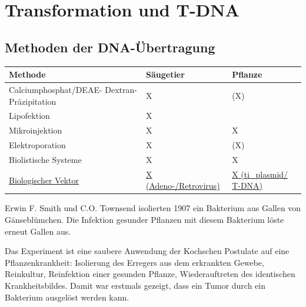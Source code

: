 \section{Transformation und T-DNA}\label{sec:transformation-und-t-dna}

\subsection{Methoden der DNA-Übertragung}\label{subsec:methoden-der-dna-ubertragung}
\begin{mytable}
    \begin{tabular}{|p{10cm}|l|l|}
        \hline
        \textbf{Methode}                & \textbf{Säugetier}                & \textbf{Pflanze}                  \\ \hline
        Calciumphosphat/DEAE-
        Dextran-Präzipitation           & X                                 & (X)                               \\
        Lipofektion                     & X                                 &                                   \\
        Mikroinjektion                  & X                                 & X                                 \\
        Elektroporation                 & X                                 & (X)                               \\
        Biolistische Systeme            & X                                 & X                                 \\
        \underline{Biologischer Vektor} & \underline{X (Adeno-/Retrovirus)} & \underline{X (\gls{ti_plasmid}/ T-DNA)}
    \end{tabular}
\end{mytable}


Erwin F. Smith und C.O. Townsend isolierten 1907 ein Bakterium aus
Gallen von Gänseblümchen.
Die Infektion gesunder Pflanzen mit diesem Bakterium
löste erneut Gallen aus.

\begin{bem}
    Das Experiment ist eine saubere Anwendung der Kochschen Postulate auf eine
    Pflanzenkrankheit: Isolierung des Erregers aus dem erkrankten Gewebe,
    Reinkultur, Reinfektion einer gesunden Pflanze, Wiederauftreten des
    identischen Krankheitsbildes.
    Damit war erstmals gezeigt, dass ein
    Tumor durch ein Bakterium ausgelöst werden kann.
\end{bem}

